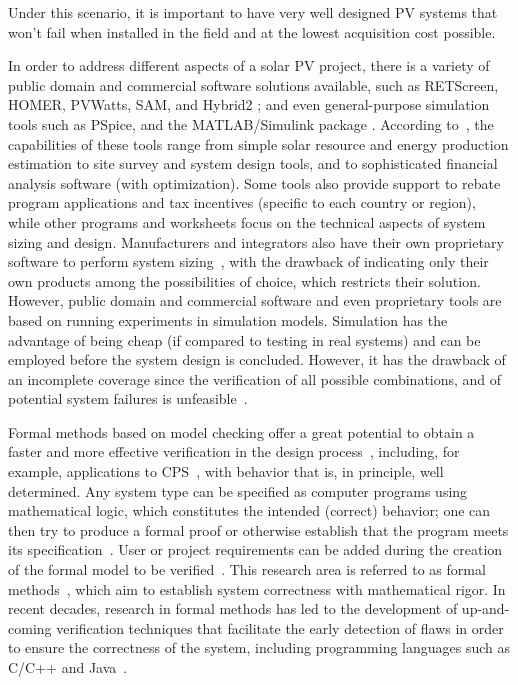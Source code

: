 Under this scenario, it is important to have very well designed PV systems that won't fail when installed in the field and at the lowest acquisition cost possible.

In order to address different aspects of a solar PV project, there is a variety of public domain and commercial software solutions  available, such as RETScreen, HOMER, PVWatts, SAM, and Hybrid2 \cite{Pradhan,Swarnkar,NRELDobos,NRELBlair,Mills}; and even general-purpose simulation tools such as PSpice, and the MATLAB/Simulink package \cite{Gow1999,Benatiallah2017}. According to~\cite{Brooks}, the capabilities of these tools range from simple solar resource and energy production estimation to site survey and system design tools, and to sophisticated financial analysis software (with optimization). Some tools also provide support to rebate program applications and tax incentives (specific to each country or region), while other programs and worksheets focus on the technical aspects of system sizing and design.  
%
Manufacturers and integrators also have their own proprietary software to perform system sizing~\cite{Zhou2010}, with the drawback of indicating only their own products among the possibilities of choice, which restricts their solution. 
%
However, public domain and commercial software and even proprietary tools are based on running experiments in simulation models. Simulation has the advantage of being cheap (if compared to testing in real systems) and can be employed before the system design is concluded. However, it has the drawback of an incomplete coverage since the verification of all possible combinations, and of potential system failures is unfeasible~\cite{ClarkeHV18}.

Formal methods based on model checking offer a great potential to obtain a faster and more effective verification in the design process~\cite{ClarkeHV18}, including, for example, applications to CPS~\cite{Abateetal2017,AbateBCCDKK17,Bessa,ChavesBCKF17}, with behavior that is, in principle, well determined. 
Any system type can be specified as computer programs using mathematical logic, which constitutes the intended (correct) behavior; one can then try to produce a formal proof or otherwise establish that the program meets its specification~\cite{DBLP:journals/sttt/GadelhaIC17}. User or project requirements can be added during the creation of the formal model to be verified~\cite{Trindade,TrindadeDJISC17}. 
%
This research area is referred to as formal methods~\cite{Clarkeetal}, which aim to establish system correctness with mathematical rigor. 
In recent decades, research in formal methods has led to the development of up-and-coming verification techniques that facilitate the early detection of flaws in order to ensure the correctness of the system, including programming languages such as C/C++ and Java~\cite{esbmc2018,RamalhoFSMC013,CordeiroKKST18}. 

